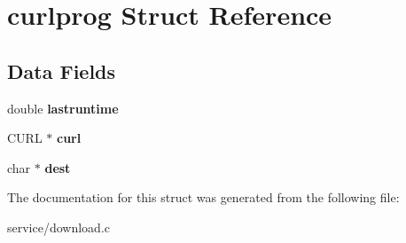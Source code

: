 \hypertarget{structcurlprog}{}\section{curlprog Struct Reference}
\label{structcurlprog}
\subsection*{Data Fields}
\begin{DoxyCompactItemize}
\item 
\mbox{\label{structcurlprog_a55119f58afa517c78cd891ecaebe7b5f}} 
double {\bfseries lastruntime}
\item 
\mbox{\label{structcurlprog_aec4ba7a3bcf358cf67ed28ce99ae3735}} 
C\+U\+RL $\ast$ {\bfseries curl}
\item 
\mbox{\label{structcurlprog_abcdecb5be479e46a07cf85ba9e7fd130}} 
char $\ast$ {\bfseries dest}
\end{DoxyCompactItemize}


The documentation for this struct was generated from the following file\+:\begin{DoxyCompactItemize}
\item 
service/download.\+c\end{DoxyCompactItemize}
